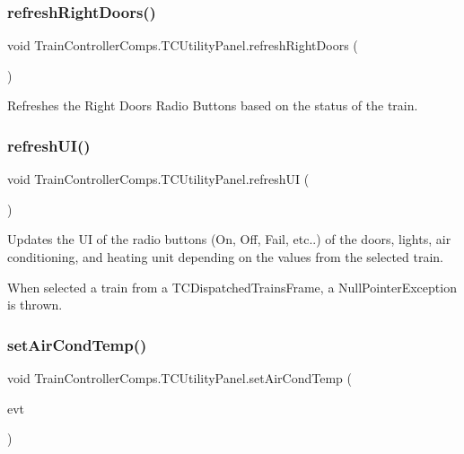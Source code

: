\subsubsection{\texorpdfstring{refresh\+Right\+Doors()}{refreshRightDoors()}}
{\footnotesize\ttfamily void Train\+Controller\+Comps.\+T\+C\+Utility\+Panel.\+refresh\+Right\+Doors (\begin{DoxyParamCaption}{ }\end{DoxyParamCaption})\hspace{0.3cm}{\ttfamily [private]}}



Refreshes the Right Doors Radio Buttons based on the status of the train. 

\mbox{\label{classTrainControllerComps_1_1TCUtilityPanel_a5dd9a443969c62f13365769ef543014f}} 
\subsubsection{\texorpdfstring{refresh\+U\+I()}{refreshUI()}}
{\footnotesize\ttfamily void Train\+Controller\+Comps.\+T\+C\+Utility\+Panel.\+refresh\+UI (\begin{DoxyParamCaption}{ }\end{DoxyParamCaption})}



Updates the UI of the radio buttons (On, Off, Fail, etc..) of the doors, lights, air conditioning, and heating unit depending on the values from the selected train. 

When selected a train from a T\+C\+Dispatched\+Trains\+Frame, a Null\+Pointer\+Exception is thrown.\mbox{\label{classTrainControllerComps_1_1TCUtilityPanel_ac0b4656718e1a3b6d9a794b89ce5046c}} 
\subsubsection{\texorpdfstring{set\+Air\+Cond\+Temp()}{setAirCondTemp()}}
{\footnotesize\ttfamily void Train\+Controller\+Comps.\+T\+C\+Utility\+Panel.\+set\+Air\+Cond\+Temp (\begin{DoxyParamCaption}\item[{java.\+awt.\+event.\+Action\+Event}]{evt }\end{DoxyParamCaption})\hspace{0.3cm}{\ttfamily [private]}}



